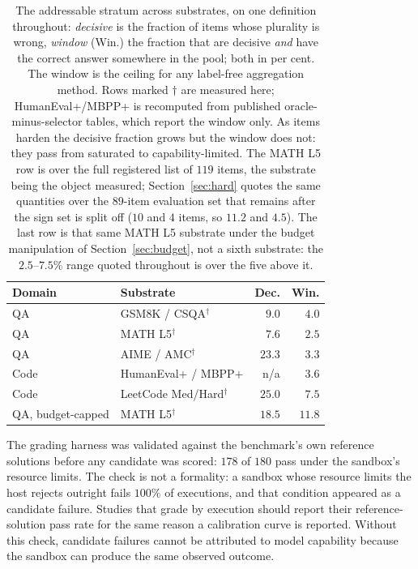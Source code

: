 \documentclass[conference]{IEEEtran}
\begin{document}
\begin{table}[t]
\caption{The addressable stratum across substrates, on one definition
throughout: \emph{decisive} is the fraction of items whose plurality is wrong,
\emph{window} (Win.) the fraction that are decisive \emph{and} have the
correct answer somewhere in the pool; both in per cent. The window is the ceiling for any label-free
aggregation method. Rows marked $\dagger$ are measured here; HumanEval+/MBPP+
is recomputed from published oracle-minus-selector tables, which report the
window only. As items harden the decisive fraction grows but the window does
not: they pass from saturated to capability-limited. The MATH L5 row is over
the full registered list of $119$ items, the substrate being the object
measured; Section~\ref{sec:hard} quotes the same quantities over the $89$-item
evaluation set that remains after the sign set is split off ($10$ and $4$
items, so $11.2$ and $4.5$). The last row is that same MATH L5 substrate
under the budget manipulation of Section~\ref{sec:budget}, not a sixth
substrate: the $2.5$--$7.5\%$ range quoted throughout is over the five
above it.}
\label{tab:window}
\centering\footnotesize
\setlength{\tabcolsep}{4pt}
\setlength{\tabcolsep}{3pt}
\begin{tabular}{@{}l l r r@{}}
\toprule
Domain & Substrate & Dec. & Win. \\
\midrule
QA & GSM8K / CSQA$^\dagger$ & $9.0$ & $4.0$ \\
QA & MATH L5$^\dagger$ & $7.6$ & $2.5$ \\
QA & AIME / AMC$^\dagger$ & $23.3$ & $3.3$ \\
Code & HumanEval+ / MBPP+ & n/a & $3.6$ \\
Code & LeetCode Med/Hard$^\dagger$ & $25.0$ & $7.5$ \\
QA, budget-capped & MATH L5$^\dagger$ & $18.5$ & $11.8$ \\
\bottomrule
\end{tabular}
\end{table}

The grading harness was validated against the benchmark's own
reference solutions before any candidate was scored: $178$ of $180$ pass
under the sandbox's resource limits. The check is not a formality: a sandbox whose
resource limits the host rejects outright fails $100\%$ of executions, and
that condition appeared as a candidate failure. Studies that grade by execution should report their
reference-solution pass rate for the same reason a calibration curve is
reported. Without this check, candidate failures cannot be attributed to model
capability because the sandbox can produce the same observed outcome.
\end{document}
